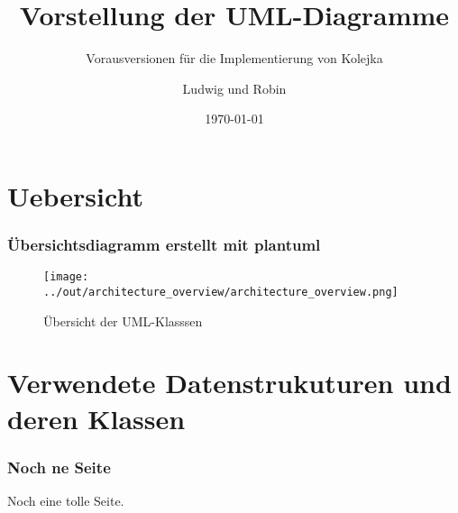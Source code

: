 \documentclass{beamer}
\title{Vorstellung der UML-Diagramme}
\subtitle{Vorausversionen für die Implementierung von Kolejka}
\author{Ludwig und Robin}
\date{\today}
\begin{document}
\maketitle
\frame{\tableofcontents[currentsection]}

\section{Uebersicht}
\begin{frame}
	\frametitle{Übersichtsdiagramm erstellt mit plantuml}	
		    \begin{figure}[h!]
            \texttt{[image: ../out/architecture\_overview/architecture\_overview.png]}
            \caption{Übersicht der UML-Klasssen}
            \label{fig:boat1}
            \end{figure}
        
\end{frame}

\section{Verwendete Datenstrukuturen und deren Klassen}
\begin{frame}
	\frametitle{Noch ne Seite}	
		\begin{center}
			Noch eine tolle Seite.
		\end{center}
\end{frame}
\end{document}
